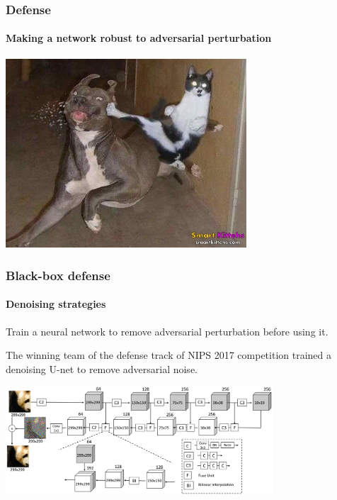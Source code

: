 \documentclass[9pt]{beamer}
\begin{document}
\begin{frame}
  \frametitle{Defense}

  \framesubtitle{Making a network robust to adversarial perturbation}

  \begin{center}
    \includegraphics[width = 9cm]{images/defense.jpg}
  \end{center}
\end{frame}

\begin{frame}
  \frametitle{Black-box defense}

  \framesubtitle{Denoising strategies}

  Train a neural network to remove adversarial perturbation before
  using it.

  \medskip

  The winning team of the defense track of NIPS 2017 competition
  trained a denoising U-net to remove adversarial noise.

  \bigskip

  \begin{center}
    \includegraphics[width = 10cm]{images/dunet.png}
  \end{center}
\end{frame}
\end{document}
